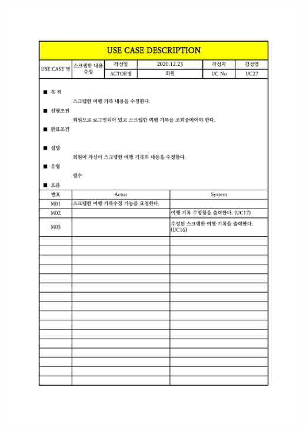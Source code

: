 {{{{{{{{{{{{{{{{{{{{{{{{{{{{{\includegraphics[width=1.1\textwidth]{./Figure/Design/Display/usecase/027.pdf} \\
}}}}}}}}}}}}}}}}}}}}}}}}}}}}}
